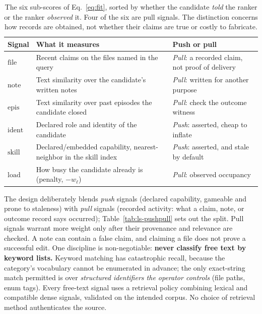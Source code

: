 \documentclass[11pt,a4paper]{article}
\theoremstyle{definition}
\theoremstyle{plain}
\begin{document}
\begin{table}[H]
\centering
\small
\renewcommand{\arraystretch}{1.25}
\begin{tabular}{@{}p{}p{}p{}@{}}
\toprule
\textbf{Signal} & \textbf{What it measures} & \textbf{Push or pull} \\
\midrule
$\mathrm{file}$  & Recent claims on the files named in the query & \emph{Pull}: a recorded claim, not proof of delivery \\
$\mathrm{note}$  & Text similarity over the candidate's written notes & \emph{Pull}: written for another purpose \\
$\mathrm{epis}$  & Text similarity over past episodes the candidate closed & \emph{Pull}: check the outcome witness \\
$\mathrm{ident}$ & Declared role and identity of the candidate & \emph{Push}: asserted, cheap to inflate \\
$\mathrm{skill}$ & Declared/embedded capability, nearest-neighbor in the skill index & \emph{Push}: asserted, and stale by default \\
$\mathrm{load}$  & How busy the candidate already is (penalty, $-w_\ell$) & \emph{Pull}: observed occupancy \\
\bottomrule
\end{tabular}
\caption{The six sub-scores of Eq.~\ref{eq:fit}, sorted by whether the candidate
\emph{told} the ranker or the ranker \emph{observed} it. Four of the six are pull
signals. The distinction concerns how records are obtained, not whether their
claims are true or costly to fabricate.}
\label{tab:fit-signals}
\end{table}

\noindent The design deliberately blends \emph{push} signals (declared capability,
gameable and prone to staleness) with \emph{pull} signals (recorded activity: what a claim, note, or outcome record says occurred); Table~\ref{tab:ls-pushpull} sets out the split. Pull signals warrant
more weight only after their provenance and relevance are checked. A note can
contain a false claim, and claiming a file does not prove a successful edit.
One discipline is non-negotiable: \textbf{never classify free text by keyword lists.} Keyword matching
has catastrophic recall, because the category's vocabulary cannot be enumerated in
advance; the only exact-string match permitted is over \emph{structured identifiers
the operator controls} (file paths, enum tags). Every free-text signal uses a
retrieval policy combining lexical and compatible dense signals, validated
on the intended corpus. No choice of retrieval method authenticates the source.
\end{document}
